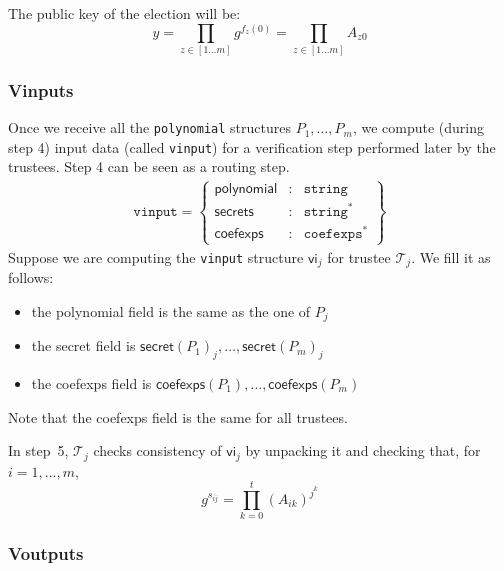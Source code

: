 \documentclass[a4paper]{article}
\newcommand{\jstring}{\texttt{string}}
\begin{document}
The public key of the election will be:
\[
y=\prod_{z\in[1\dots m]}g^{f_z(0)}=\prod_{z\in[1\dots m]}A_{z0}
\]

\subsubsection{Vinputs}
\label{vinputs}

Once we receive all the \texttt{polynomial} structures
$P_1,\dotsc,P_m$, we compute (during step 4) input data (called
\texttt{vinput}) for a verification step performed later by the
trustees. Step 4 can be seen as a routing step.
\begin{gather*}
  \texttt{vinput}=\left\{
    \begin{array}{rcl}
      \textsf{polynomial}&:&\jstring\\
      \textsf{secrets}&:&\jstring^\ast\\
      \textsf{coefexps}&:&\texttt{coefexps}^\ast
    \end{array}
  \right\}
\end{gather*}
Suppose we are computing the \texttt{vinput} structure $\textsf{vi}_j$
for trustee $\mathcal{T}_j$. We fill it as follows:
\begin{itemize}
\item the \textsf{polynomial} field is the same as the one of $P_j$
\item the \textsf{secret} field is
  $\textsf{secret}(P_1)_j,\dotsc,\textsf{secret}(P_m)_j$
\item the \textsf{coefexps} field is
  $\textsf{coefexps}(P_1),\dotsc,\textsf{coefexps}(P_m)$
\end{itemize}
Note that the \textsf{coefexps} field is the same for all trustees.

In step~5, $\mathcal{T}_j$ checks consistency of $\textsf{vi}_j$ by unpacking it
and checking that, for $i=1,\dotsc,m$,
\[
g^{s_{ij}}=\prod_{k=0}^t(A_{ik})^{j^k}
\]

\subsubsection{Voutputs}
\label{voutputs}
\end{document}
